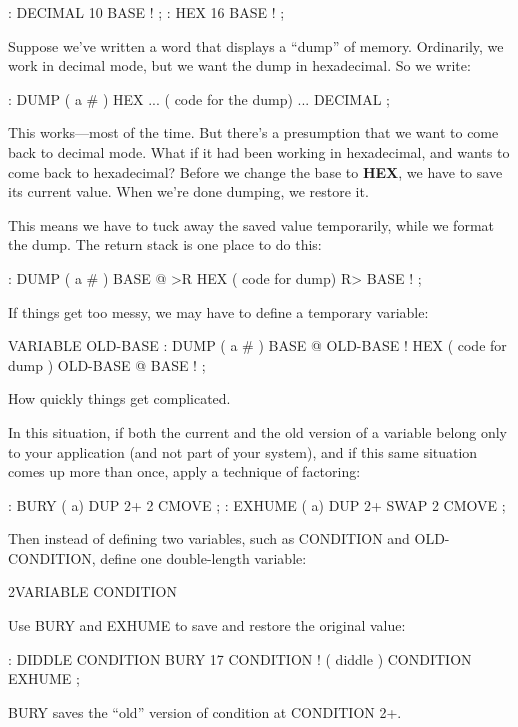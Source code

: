 \begin{Code}
: DECIMAL   10 BASE ! ;
: HEX   16 BASE ! ;
\end{Code}
Suppose we've written a word that displays a ``dump'' of memory. Ordinarily,
we work in decimal mode, but we want the dump in hexadecimal. So we write:

\begin{Code}
: DUMP  ( a # )
   HEX   ...   ( code for the dump) ... DECIMAL ;
\end{Code}
This works---most of the time. But there's a presumption that we want to
come back to decimal mode. What if it had been working in hexadecimal,
and wants to come back to hexadecimal? Before we change the base to
\textbf{HEX}, we have to save its current value. When we're done dumping, we
restore it.

This means we have to tuck away the saved value temporarily,
while we format the dump. The return stack is one place to do this:

\begin{Code}
: DUMP  ( a # )
   BASE @ >R  HEX   ( code for dump)  R> BASE ! ;
\end{Code}
If things get too messy, we may have to define a temporary variable:

\begin{Code}
VARIABLE OLD-BASE
: DUMP  ( a # )
   BASE @  OLD-BASE !  HEX ( code for dump )
   OLD-BASE @  BASE ! ;
\end{Code}
How quickly things get complicated. 

In this situation, if both the current and the old version of a variable
belong only to your application (and not part of your system), and if this
same situation comes up more than once, apply a technique of factoring:

\begin{Code}
: BURY  ( a)  DUP 2+  2 CMOVE ;
: EXHUME  ( a)  DUP 2+  SWAP 2 CMOVE ;
\end{Code}
Then instead of defining two variables, such as CONDITION and
OLD-CONDITION, define one double-length variable:

\begin{Code}
2VARIABLE CONDITION
\end{Code}
Use BURY and EXHUME to save and restore the original value:

\begin{Code}
: DIDDLE    CONDITION BURY  17 CONDITION !  ( diddle )
   CONDITION EXHUME ;
\end{Code}
BURY saves the ``old'' version of condition at CONDITION 2+.

